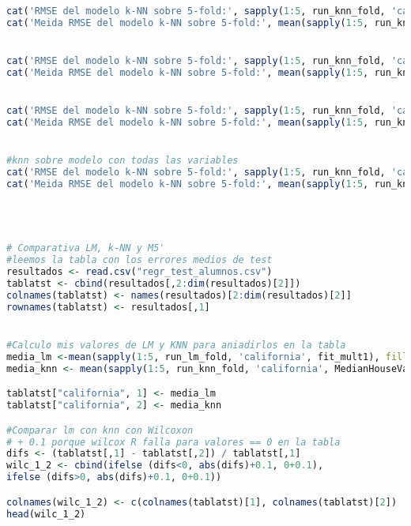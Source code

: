 \begin{lstlisting}[language=R]
cat('RMSE del modelo k-NN sobre 5-fold:', sapply(1:5, run_knn_fold, 'california', MedianHouseValue ~ . +MedianIncome*TotalRooms*HousingMedianAge*Households, k = 20), fill=T)
cat('Meida RMSE del modelo k-NN sobre 5-fold:', mean(sapply(1:5, run_knn_fold, 'california', MedianHouseValue ~ . +MedianIncome*TotalRooms*HousingMedianAge*Households, k = 20), fill=T))


cat('RMSE del modelo k-NN sobre 5-fold:', sapply(1:5, run_knn_fold, 'california', MedianHouseValue ~ . +MedianIncome*TotalRooms*HousingMedianAge*Households, k = 25), fill=T)
cat('Meida RMSE del modelo k-NN sobre 5-fold:', mean(sapply(1:5, run_knn_fold, 'california', MedianHouseValue ~ . +MedianIncome*TotalRooms*HousingMedianAge*Households, k = 25), fill=T))


cat('RMSE del modelo k-NN sobre 5-fold:', sapply(1:5, run_knn_fold, 'california', MedianHouseValue ~ . +MedianIncome*TotalRooms*HousingMedianAge*Households, k = 50), fill=T)
cat('Meida RMSE del modelo k-NN sobre 5-fold:', mean(sapply(1:5, run_knn_fold, 'california', MedianHouseValue ~ . +MedianIncome*TotalRooms*HousingMedianAge*Households, k = 50), fill=T))


#knn sobre modelo con todas las variables
cat('RMSE del modelo k-NN sobre 5-fold:', sapply(1:5, run_knn_fold, 'california', MedianHouseValue ~ ., k = 20), fill=T)
cat('Meida RMSE del modelo k-NN sobre 5-fold:', mean(sapply(1:5, run_knn_fold, 'california', MedianHouseValue ~ ., k = 20), fill=T))




# Comparativa LM, k-NN y M5'
#leemos la tabla con los errores medios de test
resultados <- read.csv("regr_test_alumnos.csv")
tablatst <- cbind(resultados[,2:dim(resultados)[2]])
colnames(tablatst) <- names(resultados)[2:dim(resultados)[2]]
rownames(tablatst) <- resultados[,1]


#Calculo mis valores de LM y KNN para aniadirlos en la tabla
media_lm <-mean(sapply(1:5, run_lm_fold, 'california', fit_mult1), fill=T)
media_knn <- mean(sapply(1:5, run_knn_fold, 'california', MedianHouseValue ~., k = 20), fill=T)

tablatst["california", 1] <- media_lm
tablatst["california", 2] <- media_knn

#Comparar lm con knn con Wilcoxon
# + 0.1 porque wilcox R falla para valores == 0 en la tabla
difs <- (tablatst[,1] - tablatst[,2]) / tablatst[,1]
wilc_1_2 <- cbind(ifelse (difs<0, abs(difs)+0.1, 0+0.1),
ifelse (difs>0, abs(difs)+0.1, 0+0.1))

colnames(wilc_1_2) <- c(colnames(tablatst)[1], colnames(tablatst)[2])
head(wilc_1_2)


\end{lstlisting}
